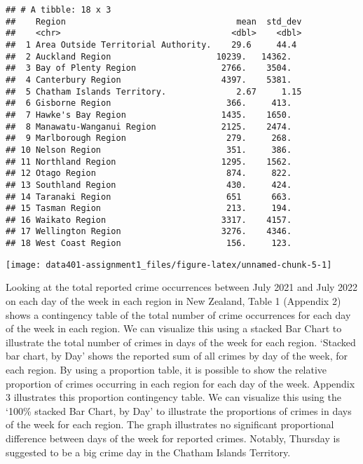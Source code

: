 \documentclass[
  10pt,
]{article}
\begin{document}
\begin{verbatim}
## # A tibble: 18 x 3
##    Region                                  mean  std_dev
##    <chr>                                  <dbl>    <dbl>
##  1 Area Outside Territorial Authority.    29.6     44.4 
##  2 Auckland Region                     10239.   14362.  
##  3 Bay of Plenty Region                 2766.    3504.  
##  4 Canterbury Region                    4397.    5381.  
##  5 Chatham Islands Territory.              2.67     1.15
##  6 Gisborne Region                       366.     413.  
##  7 Hawke's Bay Region                   1435.    1650.  
##  8 Manawatu-Wanganui Region             2125.    2474.  
##  9 Marlborough Region                    279.     268.  
## 10 Nelson Region                         351.     386.  
## 11 Northland Region                     1295.    1562.  
## 12 Otago Region                          874.     822.  
## 13 Southland Region                      430.     424.  
## 14 Taranaki Region                       651      663.  
## 15 Tasman Region                         213.     194.  
## 16 Waikato Region                       3317.    4157.  
## 17 Wellington Region                    3276.    4346.  
## 18 West Coast Region                     156.     123.
\end{verbatim}

\begin{center}\texttt{[image: data401-assignment1\_files/figure-latex/unnamed-chunk-5-1]} \end{center}

Looking at the total reported crime occurrences between July 2021 and
July 2022 on each day of the week in each region in New Zealand, Table 1
(Appendix 2) shows a contingency table of the total number of crime
occurrences for each day of the week in each region. We can visualize
this using a stacked Bar Chart to illustrate the total number of crimes
in days of the week for each region. `Stacked bar chart, by Day' shows
the reported sum of all crimes by day of the week, for each region. By
using a proportion table, it is possible to show the relative proportion
of crimes occurring in each region for each day of the week. Appendix 3
illustrates this proportion contingency table. We can visualize this
using the `100\% stacked Bar Chart, by Day' to illustrate the
proportions of crimes in days of the week for each region. The graph
illustrates no significant proportional difference between days of the
week for reported crimes. Notably, Thursday is suggested to be a big
crime day in the Chatham Islands Territory.
\end{document}
